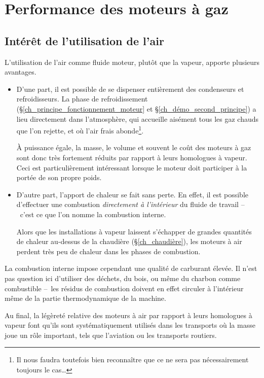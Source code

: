 \section{Performance des moteurs à gaz}

	\subsection{Intérêt de l’utilisation de l’air}

		L’utilisation de l’air comme fluide moteur, plutôt que la vapeur, apporte plusieurs avantages.

		\begin{itemize}
			\item D’une part, il est possible de se dispenser entièrement des condenseurs et refroidisseurs. La phase de refroidissement (\S\ref{ch_principe_fonctionnement_moteur} et \S\ref{ch_démo_second_principe}) a lieu directement dans l’atmosphère, qui accueille aisément tous les gaz chauds que l’on rejette, et où l’air frais abonde\footnote{Il nous faudra toutefois bien reconnaître que ce ne sera pas nécessairement toujours le cas…}.

			À puissance égale, la masse, le volume et souvent le coût des moteurs à gaz sont donc très fortement réduits par rapport à leurs homologues à vapeur. Ceci est particulièrement intéressant lorsque le moteur doit participer à la portée de son propre poids.

			\item D’autre part, l’apport de chaleur se fait sans perte. En effet, il est possible d’ef\-fec\-tuer une combustion \emph{directement à l’intérieur} du fluide de travail --\ c’est ce que l’on nomme la combustion interne. 

			Alors que les installations à vapeur laissent s’échapper de grandes quantités de chaleur au-dessus de la chaudière (\S\ref{ch_chaudière}), les moteurs à air perdent très peu de chaleur dans les phases de combustion.

		\end{itemize}

		La combustion interne impose cependant une qualité de carburant élevée. Il n’est pas question ici d’utiliser des déchets, du bois, ou même du charbon comme combustible --\ les résidus de combustion doivent en effet circuler à l’intérieur même de la partie thermodynamique de la machine.

		Au final, la légèreté relative des moteurs à air par rapport à leurs homologues à vapeur font qu’ils sont systématiquement utilisés dans les transports où la masse joue un rôle important, tels que l’aviation ou les transports routiers.



